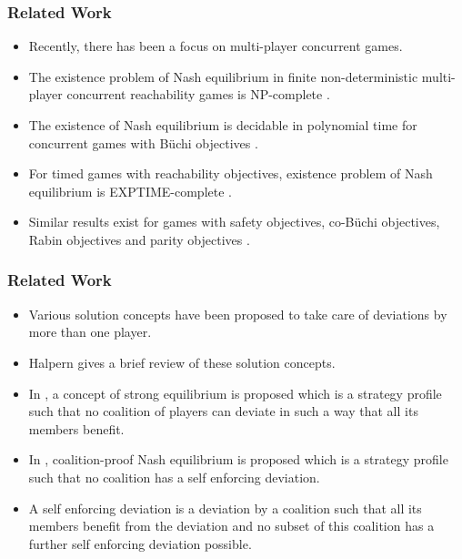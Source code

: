 \documentclass{beamer}
\begin{document}
\begin{frame}
\frametitle{Related Work}
  \begin{itemize}
	\item Recently, there has been a focus on multi-player concurrent games.
 	\item The existence problem of Nash equilibrium in finite non-deterministic multi-player concurrent reachability games is NP-complete \cite{BBM-concur10,BBM-report,Romain-phd}.
 	\item The existence of Nash equilibrium is decidable in polynomial time for concurrent games with B{\"u}chi objectives \cite{BBMU-fsttcs11,Romain-phd}.
 	\item For timed games with reachability objectives, existence problem of Nash equilibrium is EXPTIME-complete \cite{BBM-concur10,BBM-report,Romain-phd}.
  	\item Similar results exist for games with safety objectives, co-B{\"u}chi objectives, Rabin objectives and parity objectives \cite{Romain-phd}.
  \end{itemize}
\end{frame}

\begin{frame}
\frametitle{Related Work}
  \begin{itemize}
	\item Various solution concepts have been proposed to take care of deviations by more than one player.
 	\item Halpern \cite{Halpern-2008,Halpern-2011} gives a brief review of these solution concepts.
 	\item In \cite{Aumann-59}, a concept of strong equilibrium is proposed which is a strategy profile such that no coalition of players can deviate in such a way that all its members benefit.
  	\item In \cite{Bernheim-1987}, coalition-proof Nash equilibrium is proposed which is a strategy profile such that no coalition has a self enforcing deviation.
  	\item A self enforcing deviation is a deviation by a coalition such that all its members benefit from the deviation and no subset of this coalition has a further self enforcing deviation possible.
  \end{itemize}
\end{frame}
\end{document}
